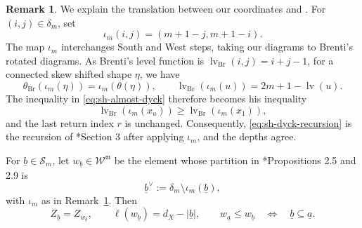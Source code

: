 \documentclass[12pt]{amsart}
\renewcommand{\a}{\underline{a}}
\renewcommand{\b}{\underline{b}}
\newcommand{\mc}[1]{\mathcal{#1}}
\theoremstyle{definition}
\newtheorem{remark}[theorem]{Remark}
\numberwithin{equation}{section}
\newcommand{\m}{\mathfrak m}
\newcommand{\W}{\mathscr W}
\begin{document}
\begin{remark}\label{rem:sh-brenti-conventions}
We explain the translation between our coordinates and \cite{brenti}. For $(i,j)\in\delta_m$, set
\[
\iota_m(i,j)=(m+1-j,m+1-i).
\]
The map $\iota_m$ interchanges South and West steps, taking our diagrams to Brenti's rotated diagrams. As Brenti's level function is
$\operatorname{lv}_{\mathrm{Br}}(i,j)=i+j-1$, for a connected skew shifted shape $\eta$, we have
\[
\theta_{\mathrm{Br}}(\iota_m(\eta))=\iota_m(\theta(\eta)),
\qquad
\operatorname{lv}_{\mathrm{Br}}(\iota_m(u))
=2m+1-\operatorname{lv}(u).
\]
The inequality in \eqref{eq:sh-almost-dyck} therefore becomes
his inequality
\[
\operatorname{lv}_{\mathrm{Br}}(\iota_m(x_u))
\geq\operatorname{lv}_{\mathrm{Br}}(\iota_m(x_1)),
\]
and the last return index $r$ is unchanged. Consequently, \eqref{eq:sh-dyck-recursion} is the recursion
of \cite{brenti}*{Section 3} after applying $\iota_m$,
and the depths agree.
\end{remark}

For $\b\in\mc S_m$, let $w_{\b}\in\W^{\m}$ be the element
whose partition in \cite{brenti}*{Propositions 2.5 and 2.9} is
\[
\b^\vee:=\delta_m\setminus\iota_m(\b),
\]
with $\iota_m$ as in Remark~\ref{rem:sh-brenti-conventions}. Then
\begin{equation}\label{eq:sh-schubert-indices}
Z_{\b}=Z_{w_{\b}},\qquad
\ell(w_{\b})=d_X-|\b|,\qquad
w_{\a}\leq w_{\b}
\quad\Longleftrightarrow\quad\b\subseteq\a.
\end{equation}
\end{document}
